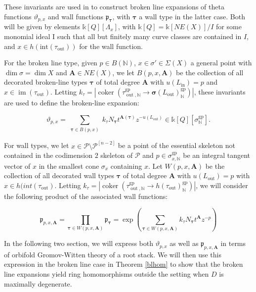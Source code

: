 \documentclass[12pt, oneside]{amsart}   	%
\newcounter{thm}
\newtheorem{corollary}[thm]{Corollary}
\newcommand{\NN}{\mathbb{N}}
\newcommand{\kk}{\mathds{k}}
\newcommand{\gp}{\operatorname{gp}}
\newcommand{\out}{\operatorname{out}}
\newcommand{\im}{\operatorname{im}}
\newcommand{\coker}{\operatorname{coker}}
\numberwithin{equation}{section}
\numberwithin{thm}{section}
\numberwithin{figure}{section}
\begin{document}
These invariants are used in \cite{scatt} to construct broken line expansions of theta functions $\vartheta_{p,x}$ and wall functions $\mathfrak{p}_{\pmb\tau}$, with $\pmb\tau$ a wall type in the latter case. Both will be given by elements $\kk[Q][\Lambda_{x}]$, with $\kk[Q] = \kk[NE(X)]/I$ for some monomial ideal I such that all but finitely many curve classes are contained in $I$, and $x \in h(\text{int}(\tau_{\out}))$ for the wall function. 

For the broken line type, given $p \in B(\NN)$, $x \in \sigma' \in \Sigma(X)$ a general point with $\dim \sigma = \dim X$ and $\textbf{A} \in NE(X)$, we let $B(p,x,\textbf{A})$ be the collection of all decorated broken-line types $\pmb\tau$ of total degree $\textbf{A}$ with $u(L_{\operatorname{in}}) = p$ and $x \in \im(\tau_{\out})$. Letting $k_{\tau} = |\coker(\tau_{\out,\NN}^{\gp}\rightarrow \pmb\sigma(L_{\out})^{\gp}_{\NN})|$, these invariants are used to define the broken-line expansion:

\begin{equation}\label{blexp}
\vartheta_{p,x}= \sum_{\substack{\pmb\tau \in B(p,x)}} k_{\tau}N_{\pmb\tau}t^{\textbf{A}(\pmb\tau)}z^{-u(L_{\out})} \in \kk[Q][\sigma_{\NN}^{\gp}].
\end{equation}

For wall types, we let $x \in \mathscr{P}\setminus \mathscr{P}^{[n-2]}$ be a point of the essential skeleton not contained in the codimension $2$ skeleton of $\mathscr{P}$ and $p \in \sigma_{x,\NN}^{\gp}$ be an integral tangent vector of $x$ in the smallest cone $\sigma_x$ containing $x$. Let $W(p,x,\textbf{A})$ be the collection of all decorated wall types $\pmb\tau$ of total degree $\textbf{A}$ with $u(L_{\out}) = p$ with $x \in h(int(\tau_{\out})$. Letting $k_{\tau} = |\coker(\tau_{\out,\NN}^{\gp} \rightarrow h(\tau_{\out})^{\gp}_{\NN})|$, we will consider the following product of the associated wall functions:

\begin{equation}\label{wfunc}
\mathfrak{p}_{p,x,\textbf{A}} = \prod_{\pmb\tau \in W(p,x,\textbf{A})} \mathfrak{p}_{\pmb\tau} = \exp(\sum_{\pmb\tau \in W(p,x,\textbf{A})} k_{\tau}N_{\pmb\tau}t^{\textbf{A}}z^{-p})
\end{equation}

In the following two section, we will express both $\vartheta_{p,x}$ as well as $\mathfrak{p}_{p,x,\textbf{A}}$ in terms of orbifold Gromov-Witten theory of a root stack. We will then use this expression in the broken line case in Theorem \ref{blhom} to show that the broken line expansions yield ring homomorphisms outside the setting when $D$ is maximally degenerate. 
\end{document}
